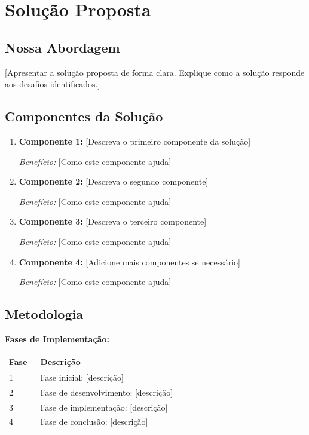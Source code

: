 \section{Solução Proposta}

\subsection{Nossa Abordagem}

[Apresentar a solução proposta de forma clara. Explique como a solução responde aos desafios identificados.]

\vskip 1cm

\subsection{Componentes da Solução}

\begin{enumerate}
    \item \textbf{Componente 1:} [Descreva o primeiro componente da solução]
    
    \textit{Benefício:} [Como este componente ajuda]
    
    \item \textbf{Componente 2:} [Descreva o segundo componente]
    
    \textit{Benefício:} [Como este componente ajuda]
    
    \item \textbf{Componente 3:} [Descreva o terceiro componente]
    
    \textit{Benefício:} [Como este componente ajuda]
    
    \item \textbf{Componente 4:} [Adicione mais componentes se necessário]
    
    \textit{Benefício:} [Como este componente ajuda]
\end{enumerate}

\vskip 1cm

\subsection{Metodologia}

\bigskip

\textbf{Fases de Implementação:}

\bigskip

\begin{tabular}{|p{0.15\linewidth}|p{0.75\linewidth}|}
    \hline
    \textbf{Fase} & \textbf{Descrição} \\
    \hline
    1 & Fase inicial: [descrição] \\
    \hline
    2 & Fase de desenvolvimento: [descrição] \\
    \hline
    3 & Fase de implementação: [descrição] \\
    \hline
    4 & Fase de conclusão: [descrição] \\
    \hline
\end{tabular}

\bigskip
